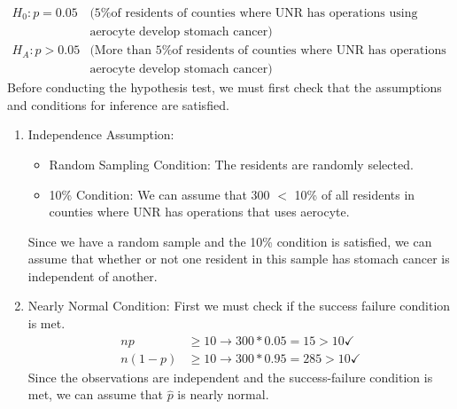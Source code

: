 {
{
\begin{align*}
H_0: p = 0.05 &\text{(5\% of residents of counties where UNR has operations using} \\
&\text{aerocyte develop stomach cancer)} \\
H_A: p > 0.05 &\text{(More than 5\% of residents of counties where UNR has operations using} \\
&\text{aerocyte develop stomach cancer)}
\end{align*}
Before conducting the hypothesis test, we must first check that the assumptions and conditions for inference are satisfied.
\begin{enumerate}[1.]
\item Independence Assumption: 
\begin{itemize}
\item Random Sampling Condition:  The residents are randomly selected.
\item 10\% Condition: We can assume that 300 $<$ 10\% of all residents in counties where UNR has operations that uses aerocyte.
\end{itemize}
Since we have a random sample and the 10\% condition is satisfied, we can assume that whether or not one resident in this sample has stomach cancer is independent of another.
\item Nearly Normal Condition: First we must check if the success failure condition is met.
\begin{align*}
np &\ge 10 \rightarrow 300 * 0.05 = 15 > 10 \checkmark \\
n(1 - p) &\ge 10 \rightarrow 300 * 0.95 = 285 > 10 \checkmark
\end{align*}
Since the observations are independent and the success-failure condition is met, we can assume that $\hat{p}$ is nearly normal.

\end{enumerate}}}
